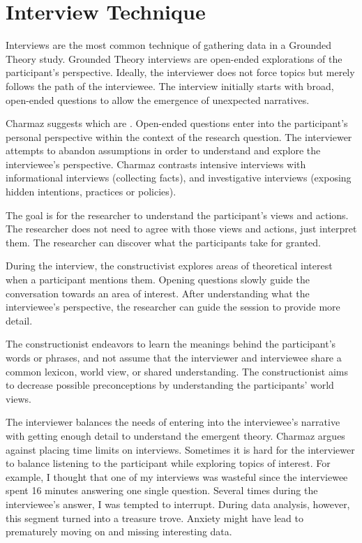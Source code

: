 \section{Interview Technique}
Interviews are the most common technique of gathering data in a Grounded Theory study. Grounded Theory interviews are open-ended explorations of the participant's perspective. Ideally, the interviewer does not force topics but merely follows the path of the interviewee. The interview initially starts with broad, open-ended questions to allow the emergence of unexpected narratives. 

Charmaz suggests  which are  \cite{Charmaz}. Open-ended questions enter into the participant's personal perspective within the context of the research question. The interviewer attempts to abandon assumptions in order to understand and explore the interviewee's perspective. Charmaz \cite{Charmaz} contrasts intensive interviews with informational interviews (collecting facts), and investigative interviews (exposing hidden intentions, practices or policies).

The goal is for the researcher to understand the participant's views and actions. The researcher does not need to agree with those views and actions, just interpret them. The researcher can discover what the participants take for granted.

During the interview, the constructivist explores areas of theoretical interest when a participant mentions them. Opening questions slowly guide the conversation towards an area of interest. After understanding what the interviewee's perspective, the researcher can guide the session to provide more detail.

The constructionist endeavors to learn the meanings behind the participant's words or phrases, and not assume that the interviewer and interviewee share a common lexicon, world view, or shared understanding. The constructionist aims to decrease possible preconceptions by understanding the participants' world views. 

The interviewer balances the needs of entering into the interviewee's narrative with getting enough detail to understand the emergent theory. Charmaz argues against placing time limits on interviews. Sometimes it is hard for the interviewer to balance listening to the participant while exploring topics of interest. For example, I thought that one of my interviews was wasteful since the interviewee spent 16 minutes answering one single question. Several times during the interviewee's answer, I was tempted to interrupt. During data analysis, however, this segment turned into a treasure trove. Anxiety might have lead to prematurely moving on and missing interesting data. 

